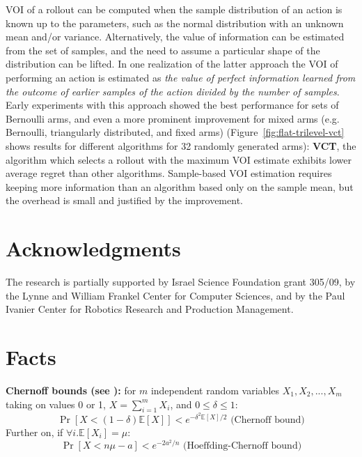 \documentclass{article}
\newcommand {\IE} {\ensuremath {\mathbb{E}}}
\begin{document}
VOI of a rollout can be computed when the sample distribution of an
action is known up to the parameters, such as the normal distribution
with an unknown mean and/or variance. Alternatively, the value of
information can be estimated from the set of samples, and the need to
assume a particular shape of the distribution can be lifted. In one
realization of the latter approach the VOI of performing an action is
estimated as \emph{the value of perfect information learned from the
  outcome of earlier samples of the action divided by the number of
  samples}. Early experiments with this approach showed the best
performance for sets of Bernoulli arms, and even a more prominent
improvement for mixed arms (e.g. Bernoulli, triangularly distributed,
and fixed arms) (Figure~\ref{fig:flat-trilevel-vct} shows results for
different algorithms for 32 randomly generated arms): \textbf{VCT},
the algorithm which selects a rollout with the maximum VOI estimate
exhibits lower average regret than other algorithms. Sample-based VOI
estimation requires keeping more information than an algorithm based
only on the sample mean, but the overhead is small and justified by
the improvement.

\section*{Acknowledgments}

The research is partially supported by Israel
Science Foundation grant 305/09, by the Lynne and William Frankel
Center for Computer Sciences, and by the Paul Ivanier Center for
Robotics Research and Production Management.

\clearpage
\appendix

\section{Facts}

{\bf Chernoff bounds (see \cite{Hagerup.chernoff}):} for $m$ independent random variables $X_1, X_2, ..., X_m$
taking on values 0 or 1, $X=\sum_{i=1}^m X_i$, and $0\le\delta\le 1$:
\begin{equation}
\Pr[X < (1-\delta)\IE[X]] < e^{-\delta^2\IE[X]/2} \mbox{ (Chernoff bound)}
\label{eq:chernoff-bound}
\end{equation}
Further on, if $\forall i. \IE[X_i]=\mu$:
\begin{equation}
\Pr[X < n\mu-a] <  e^{-2a^2/n}
\label{eq:chernoff-hoeffding-bound} \mbox{ (Hoeffding-Chernoff bound)}
\end{equation}
\end{document}
